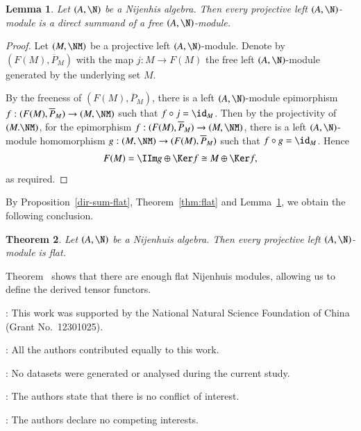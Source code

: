 \documentclass[12pt]{amsart}
\newtheorem{theorem}{Theorem}[section]
\newtheorem{lemma}[theorem]{Lemma}
\theoremstyle{definition}
\begin{document}
\begin{lemma}\label{proj-free}
Let $(A,\N)$ be a Nijenhis algebra. Then every projective left $(A,\N)$-module is a direct summand of a free $(A,\N)$-module.
\end{lemma}

\begin{proof}
Let $(M,\NM)$ be a projective left $(A,\N)$-module. Denote by $(F(M), \overline{P}_M)$ with the map $j: M \to F(M)$  the free left $(A,\N)$-module generated by the underlying set $M$. 

By the freeness of $(F(M), \overline{P}_M)$, there is a left $(A,\N)$-module epimorphism $f:(F(M), \overline{P}_M) \to (M, \NM)$ such that $f \circ j=\id_{M}$.  Then by the projectivity of $(M. \NM)$, for the epimorphism $f:(F(M), \overline{P}_M) \to (M,\NM)$, there is a left $(A,\N)$-module homomorphism $g:(M, \NM) \to (F(M), \overline{P}_M)$ such that $f \circ g=\id_{M}$. Hence
\begin{align*}
F(M)=\IIm g \oplus \Ker f \cong M \oplus \Ker f,
\end{align*}
as required.
\end{proof}

By Proposition~\ref{dir-sum-flat}, Theorem~\ref{thm:flat} and Lemma~\ref{proj-free}, we obtain the following conclusion.

\begin{theorem}
Let $(A,\N)$ be a Nijenhuis algebra. Then every projective left $(A,\N)$-module is flat.
\end{theorem}

Theorem~ shows that there are enough flat Nijenhuis modules, allowing us to define the derived tensor functors.

: This work was supported by the National Natural Science Foundation of China (Grant No.~12301025).


: All the authors contributed equally to this work.

: No datasets were generated or analysed during the current study.

\vspace{0.5cm}

\hspace{-0.4cm}{\bf Declarations}

: The authors state that there is no conflict of interest.

: The authors declare no competing interests.
\end{document}
